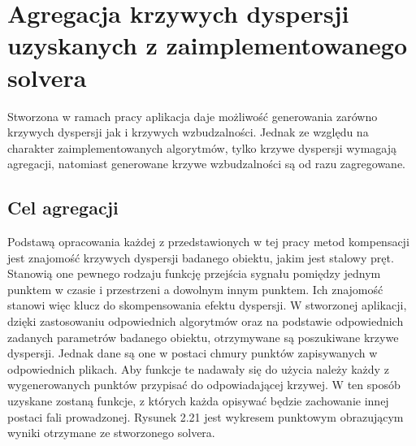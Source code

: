 \section{Agregacja krzywych dyspersji uzyskanych z zaimplementowanego solvera}
\label{sec:agregacja}
Stworzona w ramach pracy aplikacja daje możliwość generowania zarówno krzywych dyspersji jak i krzywych wzbudzalności. Jednak ze względu na charakter zaimplementowanych algorytmów, tylko krzywe dyspersji wymagają agregacji, natomiast generowane krzywe wzbudzalności są od razu zagregowane.

\subsection{Cel agregacji}
Podstawą opracowania każdej z przedstawionych w tej pracy metod kompensacji jest znajomość krzywych dyspersji badanego obiektu, jakim jest stalowy pręt. Stanowią one pewnego rodzaju funkcję przejścia sygnału pomiędzy jednym punktem w czasie i przestrzeni a dowolnym innym punktem. Ich znajomość stanowi więc klucz do skompensowania efektu dyspersji. W stworzonej aplikacji, dzięki zastosowaniu odpowiednich algorytmów oraz na podstawie odpowiednich zadanych parametrów badanego obiektu, otrzymywane są poszukiwane krzywe dyspersji. Jednak dane są one w postaci chmury punktów zapisywanych w odpowiednich plikach. Aby funkcje te nadawały się do użycia należy każdy z wygenerowanych punktów przypisać do odpowiadającej krzywej. W ten sposób uzyskane zostaną funkcje, z których każda opisywać będzie zachowanie innej postaci fali prowadzonej. Rysunek 2.21 jest wykresem punktowym obrazującym wyniki otrzymane ze stworzonego solvera. 

